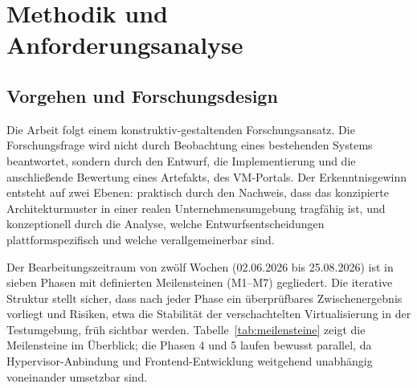 \documentclass[12pt,a4paper]{article}
\begin{document}
\newpage
\section{Methodik und Anforderungsanalyse}

\subsection{Vorgehen und Forschungsdesign}
\label{sec:vorgehen}

Die Arbeit folgt einem konstruktiv-gestaltenden Forschungsansatz. Die Forschungsfrage wird nicht durch Beobachtung eines bestehenden Systems beantwortet, sondern durch den Entwurf, die Implementierung und die anschließende Bewertung eines Artefakts, des VM-Portals. Der Erkenntnisgewinn entsteht auf zwei Ebenen: praktisch durch den Nachweis, dass das konzipierte Architekturmuster in einer realen Unternehmensumgebung tragfähig ist, und konzeptionell durch die Analyse, welche Entwurfsentscheidungen plattformspezifisch und welche verallgemeinerbar sind.

Der Bearbeitungszeitraum von zwölf Wochen (02.06.2026 bis 25.08.2026) ist in sieben Phasen mit definierten Meilensteinen (M1–M7) gegliedert. Die iterative Struktur stellt sicher, dass nach jeder Phase ein überprüfbares Zwischenergebnis vorliegt und Risiken, etwa die Stabilität der verschachtelten Virtualisierung in der Testumgebung, früh sichtbar werden. Tabelle~\ref{tab:meilensteine} zeigt die Meilensteine im Überblick; die Phasen 4 und 5 laufen bewusst parallel, da Hypervisor-Anbindung und Frontend-Entwicklung weitgehend unabhängig voneinander umsetzbar sind.
\end{document}
